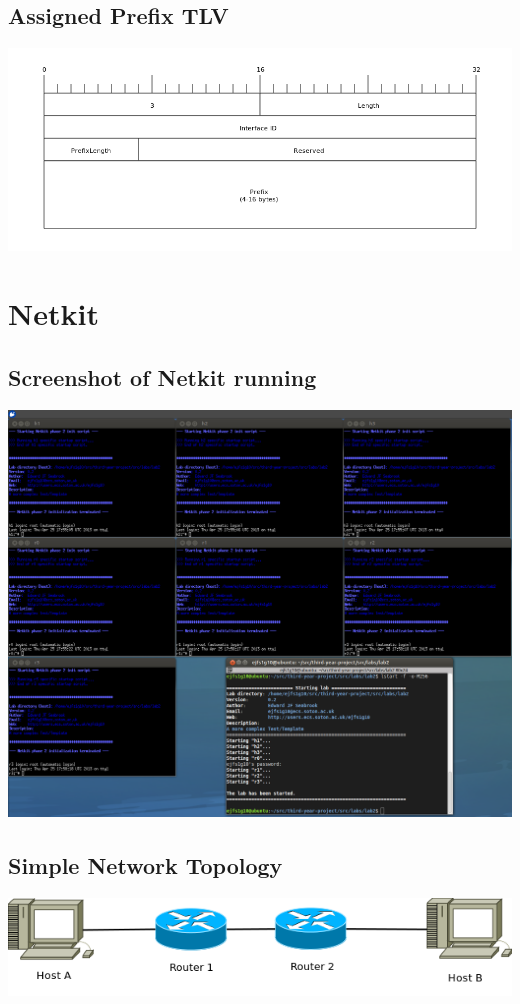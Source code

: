 \section{Assigned Prefix TLV}
\begin{center}
	\includegraphics[width=\linewidth]{../Diagrams/Packets/assigned_prefix_tlv.png}
\end{center}

\chapter{Netkit}

\section{Screenshot of Netkit running}
\begin{center}
	\includegraphics[width=\linewidth]{../Diagrams/Netkit/NetkitScreenshot.png}
\end{center}

\section{Simple Network Topology}
\begin{center}
	\includegraphics[width=\linewidth]{../Diagrams/Network/SimpleNetkit.png}
\end{center}

